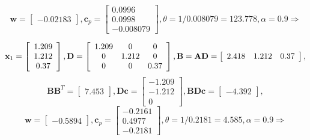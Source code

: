 \documentclass{article}
\begin{document}
\begin{enumerate}
\begin{itemize}
\begin{displaymath}
				\end{displaymath}
				\begin{displaymath}
					\mathbf{w} = \left[ \begin{array}{c} -0.02183 \end{array} \right], \mathbf{c}_p = \left[ \begin{array}{r} 0.0996 \\ 0.0998 \\ -0.008079 \end{array} \right], \theta = 1/0.008079 = 123.778, \alpha = 0.9 \Rightarrow
				\end{displaymath}

				\begin{displaymath}
					\mathbf{x}_1 = \left[ \begin{array}{c} 1.209 \\ 1.212 \\ 0.37 \end{array} \right],
					\mathbf{D} = \left[ \begin{array}{c c c} 1.209 & 0 & 0 \\ 0 & 1.212 & 0 \\ 0 & 0 & 0.37 \end{array} \right],
					\mathbf{B} = \mathbf{AD} = \left[ \begin{array}{c c c} 2.418 & 1.212 & 0.37 \end{array} \right],
				\end{displaymath}
				\begin{displaymath}
					\mathbf{BB}^T = \left[ \begin{array}{c} 7.453 \end{array} \right], \mathbf{Dc} = \left[ \begin{array}{c} -1.209 \\ -1.212 \\ 0 \end{array} \right], \mathbf{BDc} = \left[ \begin{array}{c} -4.392 \end{array} \right],
				\end{displaymath}
				\begin{displaymath}
					\mathbf{w} = \left[ \begin{array}{c} -0.5894 \end{array} \right], \mathbf{c}_p = \left[ \begin{array}{r} -0.2161 \\ 0.4977 \\ -0.2181 \end{array} \right], \theta = 1/0.2181 = 4.585, \alpha = 0.9 \Rightarrow
				\end{displaymath}


\end{itemize}
\end{enumerate}
\end{document}
